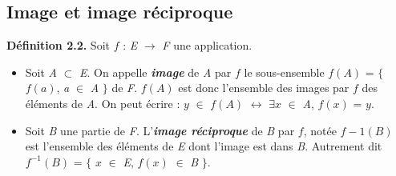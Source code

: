 \documentclass{article}
\begin{document}
\subsection{Image et image réciproque}
\textbf{Définition 2.2.} Soit $f$ : \textit{E} $\to$ \textit{F} une application.

\begin{itemize}

\item Soit \textit{A} $\subset$ \textit{E}. On appelle \textbf{\textit{image}} de \textit{A} par $f$ le sous-ensemble $f(\textit{A})$ = $\{$ $f(\textit{a})$, \textit{a} $\in$ \textit{A} $\}$ de \textit{F}. $f(\textit{A})$ est donc l’ensemble des images par $f$ des éléments de \textit{A}. On peut écrire : $y$ $\in$ $f(A)$ $\leftrightarrow$ $\exists x$ $\in$ \textit{A}, $f(x)$ = $y$.

\item Soit \textit{B} une partie de \textit{F}.  L’\textbf{\textit{image réciproque}} de \textit{B} par $f$, notée $f−1(\textit{B})$ est l’ensemble des éléments de \textit{E} dont l’image est dans \textit{B}. Autrement dit $f^{-1}(\textit{B})$ = $\{$ $x$ $\in$ \textit{E}, $f(x)$ $\in$ \textit{B} $\}$.

\end{itemize}
\end{document}

